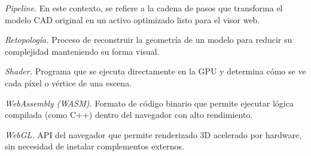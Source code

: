 \textit{Pipeline.} En este contexto, se refiere a la cadena de pasos que transforma el modelo CAD original en un activo optimizado listo para el visor web.

\textit{Retopolog\'ia.} Proceso de reconstruir la geometr\'ia de un modelo para reducir su complejidad manteniendo su forma visual.

\textit{Shader.} Programa que se ejecuta directamente en la GPU y determina c\'omo se ve cada p\'ixel o v\'ertice de una escena.

\textit{WebAssembly (WASM).} Formato de c\'odigo binario que permite ejecutar l\'ogica compilada (como C++) dentro del navegador con alto rendimiento.

\textit{WebGL.} API del navegador que permite renderizado 3D acelerado por hardware, sin necesidad de instalar complementos externos.

\newpage
